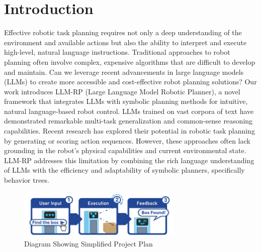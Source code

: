 \documentclass[pdflatex,sn-mathphys-num]{sn-jnl}%
\theoremstyle{thmstyleone}
\theoremstyle{thmstyletwo}%
\theoremstyle{thmstylethree}%
\begin{document}


\maketitle


\section{Introduction}\label{sec1}
Effective robotic task planning requires not only a deep understanding of the environment and available actions but also the ability to interpret and execute high-level, natural language instructions. Traditional approaches to robot planning often involve complex, expensive algorithms that are difficult to develop and maintain. Can we leverage recent advancements in large language models (LLMs) to create more accessible and cost-effective robot planning solutions? Our work introduces LLM-RP (Large Language Model Robotic Planner), a novel framework that integrates LLMs with symbolic planning methods for intuitive, natural language-based robot control.
LLMs trained on vast corpora of text have demonstrated remarkable multi-task generalization and common-sense reasoning capabilities. Recent research has explored their potential in robotic task planning by generating or scoring action sequences. However, these approaches often lack grounding in the robot's physical capabilities and current environmental state. LLM-RP addresses this limitation by combining the rich language understanding of LLMs with the efficiency and adaptability of symbolic planners, specifically behavior trees.
\begin{figure}[h]
\centering
\includegraphics[width=0.7\textwidth]{figures/Picture13.png}
\caption{Diagram Showing Simplified Project Plan}\label{fig1}
\end{figure}
\end{document}
